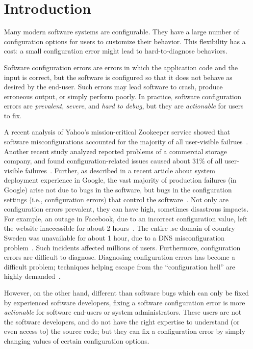 \section{Introduction}
\label{sec:introduction}

Many modern software systems are configurable. They
have a large number of configuration options for users
to customize their behavior. This flexibility has a cost:
a small configuration error might lead to hard-to-diagnose
behaviors.

Software configuration errors are errors in which
the application code and the input is correct, but the software is
configured so that it does not behave
as desired by the end-user. Such errors may lead software to crash,
produce erroneous output, or simply perform poorly.
In practice, software configuration
errors are \textit{prevalent}, \textit{severe}, and
\textit{hard to debug}, but they are \textit{actionable} for users to fix.


A recent analysis of Yahoo's mission-critical Zookeeper service
showed that software misconfigurations accounted for
the majority of all user-visible failrues~\cite{bft}. Another
recent study analyzed reported problems of a commercial
storage company, and found configuration-related issues
caused about 31\% of all user-visible failures~\cite{Yin:2011:ESC}.
Further, as described in a recent article about system deployment experience
in Google, the vast majority of production failures (in Google)
arise not due to bugs in the software, but bugs in the
configuration settings (i.e., configuration errors)
that control the software~\cite{googleconf}.
Not only are configuration errors prevalent, they
can have high, sometimes disastrous impacts. For example,
an outage in Facebook, due to
an incorrect configuration value, left the website 
inaccessible for about 2 hours~\cite{fbout}. 
The entire .se domain of country Sweden was unavailable
for about 1 hour, due to a DNS misconfiguration problem~\cite{sedown}.
Such incidents affected millions of users. Furthermore, configuration
errors are difficult to diagnose. Diagnosing
configuration errors has become a difficult problem; 
techniques helping escape from the ``configuration hell''
are highly demanded~\cite{googleconf}.

However, on the other hand, different than software bugs
which can only be fixed by experienced software developers, fixing a software
configuration error is more \textit{actionable} for software end-users
or system administrators. These users are not the software developers,
and do not have the right expertise to understand (or even access to)
the source code;  but they can fix a configuration error by simply changing
values of certain configuration options.


